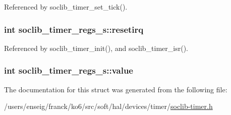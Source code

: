 Referenced by soclib\-\_\-timer\-\_\-set\-\_\-tick().

\hypertarget{structsoclib__timer__regs__s_a63084f461aed6b427e0fcf6028e70ce0}{
\subsubsection[{resetirq}]{\setlength{\rightskip}{0pt plus 5cm}int soclib\-\_\-timer\-\_\-regs\-\_\-s\-::resetirq}}\label{structsoclib__timer__regs__s_a63084f461aed6b427e0fcf6028e70ce0}


Referenced by soclib\-\_\-timer\-\_\-init(), and soclib\-\_\-timer\-\_\-isr().

\hypertarget{structsoclib__timer__regs__s_aae29d921b654ae30462d290a8353fb78}{
\subsubsection[{value}]{\setlength{\rightskip}{0pt plus 5cm}int soclib\-\_\-timer\-\_\-regs\-\_\-s\-::value}}\label{structsoclib__timer__regs__s_aae29d921b654ae30462d290a8353fb78}


The documentation for this struct was generated from the following file\-:\begin{DoxyCompactItemize}
\item 
/users/enseig/franck/ko6/src/soft/hal/devices/timer/\hyperlink{soclib-timer_8h}{soclib-\/timer.\-h}\end{DoxyCompactItemize}
